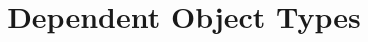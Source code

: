 \documentclass[10pt,journal,a4paper]{IEEEtran}
\begin{document}
%
\title{Dependent Object Types}
%
%
%
%
\end{document}
